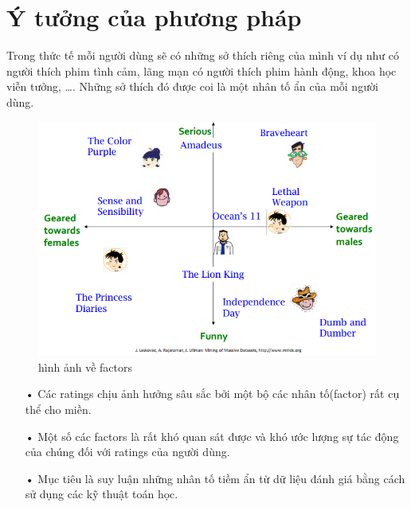 \documentclass[a4paper,10pt]{report}
\begin{document}
\section{Ý tưởng của phương pháp}
Trong thức tế mỗi người dùng sẽ có những sở thích riêng của mình ví dụ như có người thích phim tình cảm, lãng mạn có người thích phim hành động, khoa học viễn tưởng, \ldots . Những sở thích đó được coi là một nhân tố ẩn của mỗi người dùng.
\begin{figure}[h]
\begin{center}
\includegraphics[scale=0.6]{LF.png}
\caption{hình ảnh về factors}
\end{center}
\end{figure}
\begin{itemize}
\item[•] Các ratings chịu ảnh hưởng sâu sắc bởi một bộ các nhân tố(factor) rất cụ thể cho miền.
\item[•] Một số các factors là rất khó quan sát được và khó ước lượng sự tác động của chúng đối với ratings của người dùng.
\item[•] Mục tiêu là suy luận những nhân tố tiềm ẩn từ dữ liệu đánh giá bằng cách sử dụng các kỹ thuật toán học.
\end{itemize}
\end{document}
